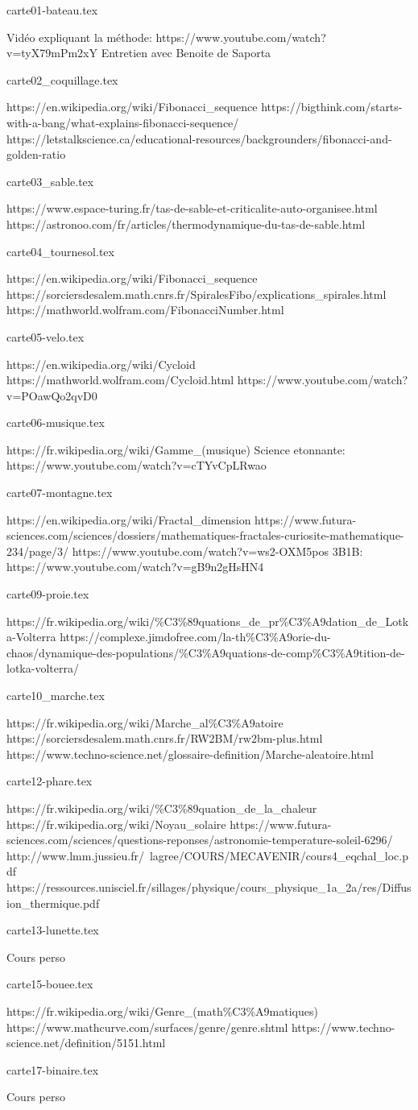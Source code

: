 carte01-bateau.tex

Vidéo expliquant la méthode: https://www.youtube.com/watch?v=tyX79mPm2xY
Entretien avec Benoite de Saporta

carte02_coquillage.tex

https://en.wikipedia.org/wiki/Fibonacci_sequence
https://bigthink.com/starts-with-a-bang/what-explains-fibonacci-sequence/
https://letstalkscience.ca/educational-resources/backgrounders/fibonacci-and-golden-ratio


carte03_sable.tex

https://www.espace-turing.fr/tas-de-sable-et-criticalite-auto-organisee.html
https://astronoo.com/fr/articles/thermodynamique-du-tas-de-sable.html


carte04_tournesol.tex

https://en.wikipedia.org/wiki/Fibonacci_sequence
https://sorciersdesalem.math.cnrs.fr/SpiralesFibo/explications_spirales.html
https://mathworld.wolfram.com/FibonacciNumber.html


carte05-velo.tex

https://en.wikipedia.org/wiki/Cycloid
https://mathworld.wolfram.com/Cycloid.html
https://www.youtube.com/watch?v=POawQo2qvD0


carte06-musique.tex

https://fr.wikipedia.org/wiki/Gamme_(musique)
Science etonnante: https://www.youtube.com/watch?v=cTYvCpLRwao


carte07-montagne.tex

https://en.wikipedia.org/wiki/Fractal_dimension
https://www.futura-sciences.com/sciences/dossiers/mathematiques-fractales-curiosite-mathematique-234/page/3/
https://www.youtube.com/watch?v=ws2-OXM5pos
3B1B: https://www.youtube.com/watch?v=gB9n2gHsHN4

carte09-proie.tex

https://fr.wikipedia.org/wiki/\%C3\%89quations_de_pr\%C3\%A9dation_de_Lotka-Volterra
https://complexe.jimdofree.com/la-th\%C3\%A9orie-du-chaos/dynamique-des-populations/\%C3\%A9quations-de-comp\%C3\%A9tition-de-lotka-volterra/

carte10_marche.tex

https://fr.wikipedia.org/wiki/Marche_al\%C3\%A9atoire
https://sorciersdesalem.math.cnrs.fr/RW2BM/rw2bm-plus.html
https://www.techno-science.net/glossaire-definition/Marche-aleatoire.html

carte12-phare.tex

https://fr.wikipedia.org/wiki/\%C3\%89quation_de_la_chaleur
https://fr.wikipedia.org/wiki/Noyau_solaire
https://www.futura-sciences.com/sciences/questions-reponses/astronomie-temperature-soleil-6296/
http://www.lmm.jussieu.fr/~lagree/COURS/MECAVENIR/cours4_eqchal_loc.pdf
https://ressources.unisciel.fr/sillages/physique/cours_physique_1a_2a/res/Diffusion_thermique.pdf


carte13-lunette.tex

Cours perso

carte15-bouee.tex

https://fr.wikipedia.org/wiki/Genre_(math\%C3\%A9matiques)
https://www.mathcurve.com/surfaces/genre/genre.shtml
https://www.techno-science.net/definition/5151.html

carte17-binaire.tex

Cours perso
